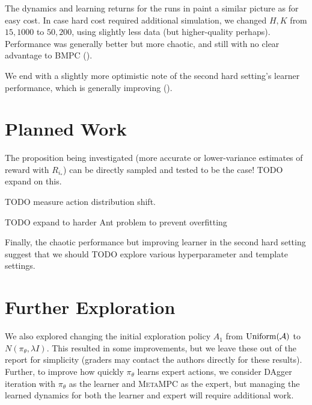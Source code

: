 \documentclass{article}
\begin{document}

The dynamics and learning returns for the runs in  paint a similar picture as for easy cost. In case hard cost required additional simulation, we changed $H,K$ from $15,1000$ to $50,200$, using slightly less data (but higher-quality perhaps). Performance was generally better but more chaotic, and still with no clear advantage to BMPC ().


We end with a slightly more optimistic note of the second hard setting's learner performance, which is generally improving ().


\section{Planned Work}

The proposition being investigated (more accurate or lower-variance estimates of reward with $R_{i_*}$) can be directly sampled and tested to be the case! TODO expand on this.

TODO measure action distribution shift.

TODO expand to harder Ant problem to prevent overfitting

Finally, the chaotic performance but improving learner in the second hard setting suggest that we should TODO explore various hyperparameter and template settings.

\section{Further Exploration}

We also explored changing the initial exploration policy $A_1$ from $\operatorname{Uniform}(\mathcal{A})$ to $N(\pi_\theta, \lambda I)$. This resulted in some improvements, but we leave these out of the report for simplicity (graders may contact the authors directly for these results). Further, to improve how quickly $\pi_\theta$ learns expert actions, we consider DAgger iteration with $\pi_\theta$ as the learner and \textsc{MetaMPC} as the expert, but managing the learned dynamics for both the learner and expert will require additional work.
\end{document}
